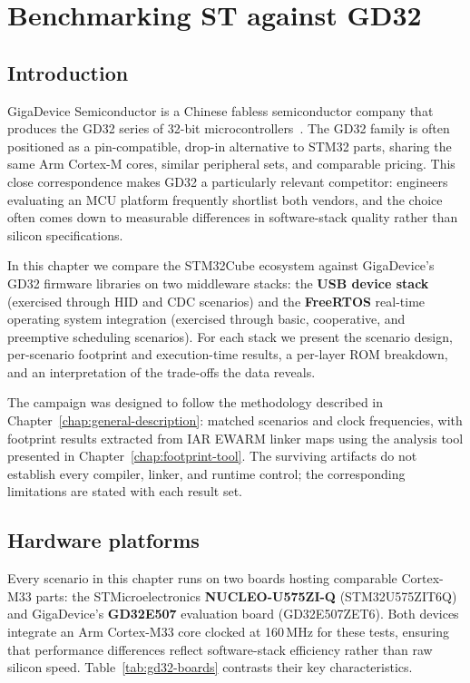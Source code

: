 \chapter{Benchmarking ST against GD32}
\label{chap:vs-gd32}

\section*{Introduction}

GigaDevice Semiconductor is a Chinese fabless semiconductor company that produces the GD32
series of 32-bit microcontrollers~\cite{gigadevice-gd32}. The GD32 family is often
positioned as a pin-compatible, drop-in alternative to STM32 parts, sharing the same Arm
Cortex-M cores, similar peripheral sets, and comparable pricing. This close correspondence
makes GD32 a particularly relevant competitor: engineers evaluating an MCU platform
frequently shortlist both vendors, and the choice often comes down to measurable differences
in software-stack quality rather than silicon specifications.

In this chapter we compare the STM32Cube ecosystem against GigaDevice's GD32 firmware
libraries on two middleware stacks: the \textbf{USB device stack} (exercised through HID and
CDC scenarios) and the \textbf{FreeRTOS} real-time operating system integration (exercised
through basic, cooperative, and preemptive scheduling scenarios). For each stack we present
the scenario design, per-scenario footprint and execution-time results, a per-layer ROM
breakdown, and an interpretation of the trade-offs the data reveals.

The campaign was designed to follow the methodology described in
Chapter~\ref{chap:general-description}: matched scenarios and clock frequencies, with
footprint results extracted from IAR EWARM linker maps using the analysis tool presented in
Chapter~\ref{chap:footprint-tool}. The surviving artifacts do not establish every compiler,
linker, and runtime control; the corresponding limitations are stated with each result set.

\section{Hardware platforms}
\label{sec:gd32-boards}

Every scenario in this chapter runs on two boards hosting comparable Cortex-M33 parts: the
STMicroelectronics \textbf{NUCLEO-U575ZI-Q} (STM32U575ZIT6Q) and GigaDevice's
\textbf{GD32E507} evaluation board (GD32E507ZET6). Both devices integrate an Arm Cortex-M33
core clocked at 160\,MHz for these tests, ensuring that performance differences reflect
software-stack efficiency rather than raw silicon speed.
Table~\ref{tab:gd32-boards} contrasts their key characteristics.

